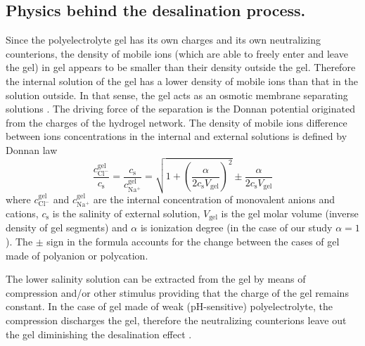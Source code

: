 \documentclass[journal,article,submit,pdftex,moreauthors]{Definitions/mdpi}
\newcommand{\cna}{c_\mathrm{Na^+}}
\newcommand{\ccl}{c_\mathrm{Cl^-}}
\newcommand{\gel}{^\mathrm{gel}}
\newcommand{\cs}{c_{\mathrm{s}}}
\newcommand{\Vgel}{V_\mathrm{gel}}
\begin{document}
\subsection{Physics behind the desalination process.}
Since the polyelectrolyte gel has its own charges and its own neutralizing counterions, the density of mobile ions (which are able to freely enter and leave the gel) in gel appears to be smaller than their density outside the gel.
Therefore the internal solution of the gel has a lower density of mobile ions than that in the solution outside. 
In that sense, the gel acts as an osmotic membrane separating solutions \cite{Rud2020}. 
The driving force of the separation is the Donnan potential originated from the charges of the hydrogel network. 
The density of mobile ions difference between ions concentrations in the internal and external solutions
is defined by Donnan law \cite{Rud2018}
\begin{equation*}
\frac{\ccl\gel}{\cs}=\frac{\cs}{\cna\gel}=\sqrt{1+\left(\frac{\alpha}{2\cs\Vgel}\right)^{2}}\pm\frac{\alpha}{2\cs\Vgel}
\end{equation*}
where $\ccl\gel$ and $\cna\gel$ are the internal concentration of monovalent anions and cations, $\cs$ is the salinity of external solution,  $\Vgel$ is the gel molar volume (inverse density of gel segments) and $\alpha$ is ionization degree (in the case of our study $\alpha=1$). 
The $\pm$ sign in the formula accounts for the change between the cases of gel made of polyanion or polycation.

The lower salinity solution can be extracted from the gel by means of compression and/or other stimulus providing that the charge of the gel remains constant.
In the case of gel made of weak (pH-sensitive) polyelectrolyte, the compression discharges the gel, therefore the neutralizing counterions leave out the gel diminishing the desalination effect \cite{Rud2018}. 
\end{document}
